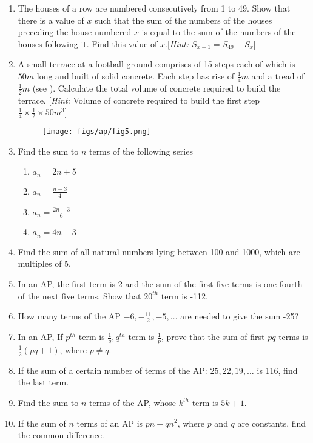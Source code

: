 \begin{enumerate}[label=\thesubsection.\arabic*, ref=\thesubsection.\theenumi]
\item The houses of a row are numbered consecutively from 1 to 49. Show that there is a value of $x$ such that the sum of the numbers of the houses preceding the house numbered $x$ is equal to the sum of the numbers of the houses following it. Find this value of $x$.[{\em Hint:} $S_{x-1} = S_{49} -S_x$]
\item A small terrace at a football ground comprises of 15 steps each of which is $50 m$ long and built of solid concrete. Each step has rise of $\frac{1}{4}m$ and a tread of $\frac{1}{2}m$ 
	(see ).
	Calculate the total volume of concrete required to build the terrace. [{\em Hint:} Volume of concrete required to build the first step = $\frac{1}{4} \times \frac{1}{2} \times 50m^3$]
	\begin{figure}[H]
		\centering
\texttt{[image: figs/ap/fig5.png]}  
		\caption{}
		\label{fig:fig5}
	\end{figure}
\item Find the sum to $n$ terms of the following series
	\begin{multicols}{4}
\begin{enumerate}
	\item $a_n =2n+5$
	\item $a_n =\frac{n-3}{4}$
\item $a_n = \frac{2n-3}{6}$
\item $a_n = 4n-3 $
\end{enumerate}
\end{multicols}
\item Find the sum of all natural numbers lying between 100 and 1000,  which are multiples of 5.
\item In an AP,  the first term is 2 and the sum of the first five terms is one-fourth of the next five terms. Show that $20^{th}$ term is -112.
\item How many terms of the AP  $-6, -\frac{11}{2},  -5, \dots $ are needed to give the sum -25?
\item In an AP,  If $p^{th}$ term is $\frac{1}{q}, q^{th}$ term is $\frac{1}{p}$,  prove that the sum of first $pq$ terms is $\frac{1}{2}(pq+1)$,  where $p \neq q.$
\item  If the sum of a certain number of terms of the AP: $25,  22,  19,  \dots $  is 116, find the last term.
\item Find the sum to $n$ terms of the AP,  whose $k^{th}$ term is $5k + 1$.
\item If the sum of $n$ terms of an AP is $pn + qn^2$,  where $p$ and $q$ are constants,  find the common difference.

\end{enumerate}
